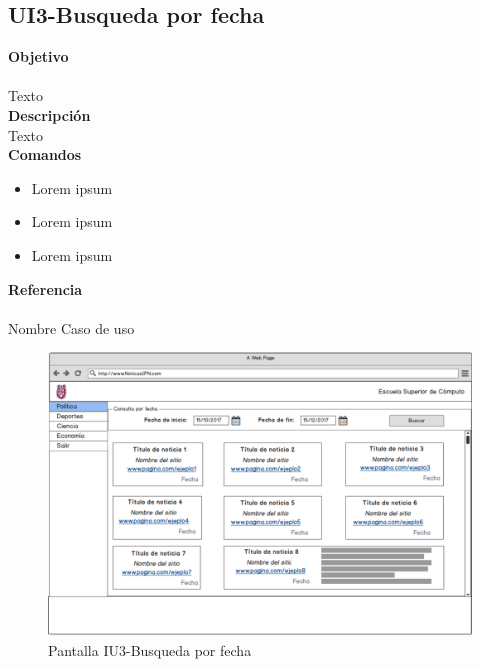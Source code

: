 \subsection{UI3-Busqueda por fecha}

\Large{\textbf{Objetivo}}\\\\
\normalsize{Texto}\\

	

\Large{\textbf{Descripción}}\\
\normalsize{Texto}\\



\Large{\textbf{Comandos}}\\
\normalsize{}

\begin{itemize}
	\item Lorem ipsum
	\item Lorem ipsum
	\item Lorem ipsum
\end{itemize}

\Large{\textbf{Referencia}}\\\\
\normalsize{Nombre Caso de uso}

\begin{figure}[h]
  \centering
	\includegraphics[scale=.3]{imagenes/Pantallas/UI3}
  \caption{Pantalla IU3-Busqueda por fecha}
  \label{fig:IU3}
\end{figure}
